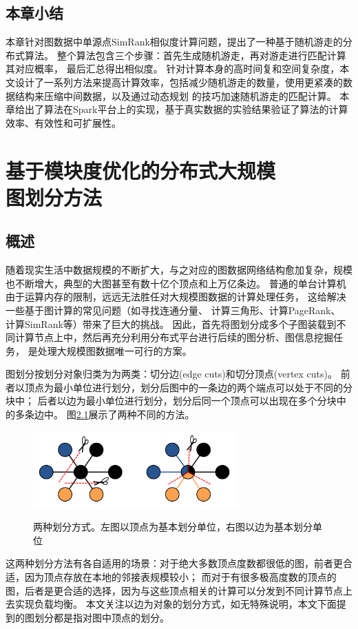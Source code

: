 \documentclass[master]{njuthesis}
\begin{document}
\section{本章小结}
本章针对图数据中单源点SimRank相似度计算问题，提出了一种基于随机游走的分布式算法。
整个算法包含三个步骤：首先生成随机游走，再对游走进行匹配计算其对应概率，
最后汇总得出相似度。
针对计算本身的高时间复和空间复杂度，本文设计了一系列方法来提高计算效率，包括减少随机游走的数量，使用更紧凑的数据结构来压缩中间数据，以及通过动态规划
的技巧加速随机游走的匹配计算。
本章给出了算法在Spark平台上的实现，基于真实数据的实验结果验证了算法的计算效率、有效性和可扩展性。
\chapter{基于模块度优化的分布式大规模  \\ 图划分方法}\label{chapter_graphpartition}
\section{概述}
随着现实生活中数据规模的不断扩大，与之对应的图数据网络结构愈加复杂，规模也不断增大，典型的大图甚至有数十亿个顶点和上万亿条边。
普通的单台计算机由于运算内存的限制，远远无法胜任对大规模图数据的计算处理任务，
这给解决一些基于图计算的常见问题（如寻找连通分量\cite{DBLP:conf/sc/HongRO13}、
计算三角形\cite{DBLP:journals/corr/abs-1011-0468}、计算PageRank\cite{page1999pagerank}、
计算SimRank\cite{jeh2002simrank}等）带来了巨大的挑战。
因此，首先将图划分成多个子图装载到不同计算节点上中，然后再充分利用分布式平台进行后续的图分析、图信息挖掘任务，
是处理大规模图数据唯一可行的方案。

图划分按划分对象归类为为两类：切分边(edge cuts)和切分顶点(vertex cuts)。
前者以顶点为最小单位进行划分，划分后图中的一条边的两个端点可以处于不同的分块中；
后者以边为最小单位进行划分，划分后同一个顶点可以出现在多个分块中的多条边中。
图\ref{fig:partition_scheme}展示了两种不同的方法。
\begin{figure}[h]
  \centering
  \includegraphics[width= 0.7\textwidth]{figure/partition_approach.png}\\
  \caption{两种划分方式。左图以顶点为基本划分单位，右图以边为基本划分单位}
  \label{fig:partition_scheme}
\end{figure}
这两种划分方法有各自适用的场景\cite{DBLP:conf/eurosys/ChenSCC15}：对于绝大多数顶点度数都很低的图，前者更合适，因为顶点存放在本地的邻接表规模较小；
而对于有很多极高度数的顶点的图，后者是更合适的选择，因为与这些顶点相关的计算可以分发到不同计算节点上去实现负载均衡。
本文关注以边为对象的划分方式，如无特殊说明，本文下面提到的图划分都是指对图中顶点的划分。
\end{document}

